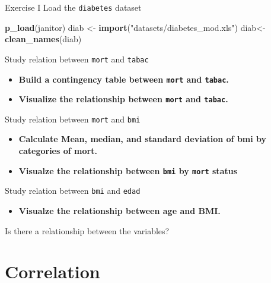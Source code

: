 \documentclass[
  ignorenonframetext,
]{beamer}
\newenvironment{Shaded}{\begin{snugshade}}{\end{snugshade}}
\newcommand{\FunctionTok}[1]{\textcolor[rgb]{0.13,0.29,0.53}{\textbf{#1}}}
\newcommand{\NormalTok}[1]{#1}
\newcommand{\OtherTok}[1]{\textcolor[rgb]{0.56,0.35,0.01}{#1}}
\newcommand{\StringTok}[1]{\textcolor[rgb]{0.31,0.60,0.02}{#1}}
\providecommand{\tightlist}{%
  \setlength{\itemsep}{0pt}\setlength{\parskip}{0pt}}
\begin{document}
\begin{frame}[fragile]{Exercise I}
Load the \texttt{diabetes} dataset

\begin{Shaded}
\begin{Highlighting}[]
\FunctionTok{p\_load}\NormalTok{(janitor)}
\NormalTok{  diab }\OtherTok{\textless{}{-}} \FunctionTok{import}\NormalTok{(}\StringTok{"datasets/diabetes\_mod.xls"}\NormalTok{)}
\NormalTok{diab}\OtherTok{\textless{}{-}} \FunctionTok{clean\_names}\NormalTok{(diab)}
\end{Highlighting}
\end{Shaded}

Study relation between \texttt{mort} and \texttt{tabac}

\begin{itemize}
\item
  \textbf{Build a contingency table between \texttt{mort} and
  \texttt{tabac}.}
\item
  \textbf{Visualize the relationship between \texttt{mort} and
  \texttt{tabac}.}
\end{itemize}

Study relation between \texttt{mort} and \texttt{bmi}

\begin{itemize}
\item
  \textbf{Calculate Mean, median, and standard deviation of bmi by
  categories of mort.}
\item
  \textbf{Visualze the relationship between \texttt{bmi} by
  \texttt{mort} status}
\end{itemize}

Study relation between \texttt{bmi} and \texttt{edad}

\begin{itemize}
\tightlist
\item
  \textbf{Visualze the relationship between age and BMI.}
\end{itemize}

Is there a relationship between the variables?
\end{frame}

\section{Correlation}\label{correlation}
\end{document}
